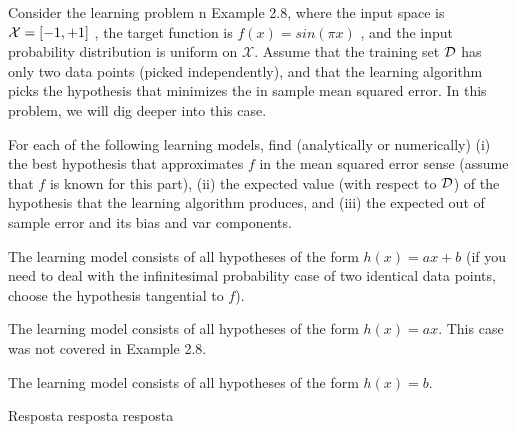\begin{enunciado}{23}
   Consider the learning problem  n Example 2.8, where the input space is $\mathcal{X} = [-1, + 1]$ , the target function is $f(x) = sin(\pi x)$ , and the input probability distribution is uniform on $\mathscr{X}$. Assume that the training set $\mathcal{D}$ has only two data points (picked independently), and that the learning algorithm picks the hypothesis that minimizes the in sample mean squared error. In this problem, we will dig deeper into this case.
   
For each of the following learning models, find (analytically or numerically)
(i) the best hypothesis that approximates $f$ in the mean squared error sense
(assume that $f$ is known for this part), (ii) the expected value (with respect
to $\mathcal{D}$) of the hypothesis that the learning algorithm produces, and (iii) the expected out of sample error and its bias and var components.

 The learning model consists of all hypotheses of the form $h(x) = ax + b$
(if you need to deal with the infinitesimal probability case of two identical data points, choose the hypothesis tangential to $f$).

 The learning model consists of all hypotheses of the form $h(x) = ax$. This case was not covered in Example 2.8.

 The learning model consists of all hypotheses of the form $h(x) = b$.
   
\end{enunciado}

Resposta resposta resposta